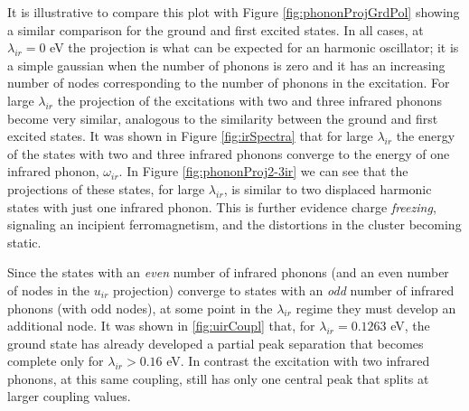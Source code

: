 It is illustrative to compare this plot with Figure \ref{fig:phononProjGrdPol} showing a similar comparison for the ground and first excited states.
In all cases, at $\lambda_{ir}=0$ eV the projection is what can be expected for an harmonic oscillator; it is a simple gaussian when the number of phonons is zero and it has an increasing number of nodes corresponding to the number of phonons in the excitation.
For large $\lambda_{ir}$ the projection of the excitations with two and three infrared phonons become very similar, analogous to the similarity between the ground and first excited states.
It was shown in Figure \ref{fig:irSpectra} that for large $\lambda_{ir}$ the energy of the states with two and three infrared phonons converge to the energy of one infrared phonon, $\omega_{ir}$.
In Figure \ref{fig:phononProj2-3ir} we can see that the projections of these states, for large $\lambda_{ir}$, is similar to two displaced harmonic states with just one infrared phonon.
This is further evidence charge \textit{freezing}, signaling an incipient ferromagnetism, and the distortions in the cluster becoming static.

Since the states with an \textit{even} number of infrared phonons (and an even number of nodes in the $u_{ir}$ projection) converge to states with an \textit{odd} number of infrared phonons (with odd nodes), at some point in the $\lambda_{ir}$ regime they must develop an additional node.
It was shown in \ref{fig:uirCoupl} that, for $\lambda_{ir}=0.1263$ eV, the ground state has already developed a partial peak separation that becomes complete only for $\lambda_{ir}>0.16$ eV.
In contrast the excitation with two infrared phonons, at this same coupling, still has only one central peak that splits at larger coupling values.